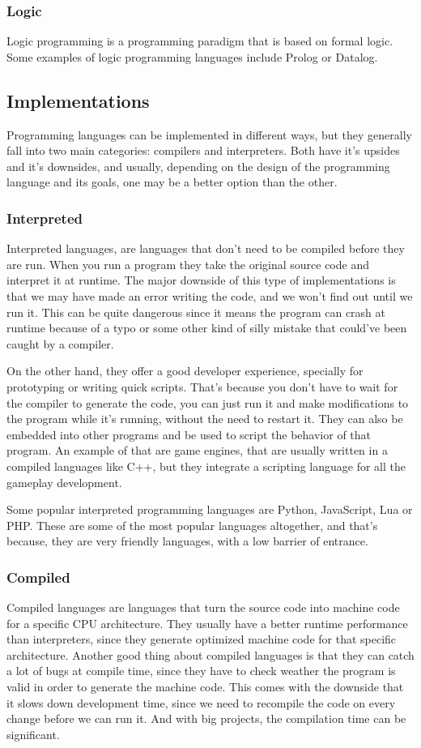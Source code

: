 ﻿\documentclass[10pt,a4paper,twocolumn,twoside]{article}
\begin{document}
\subsubsection{Logic}
Logic programming is a programming paradigm that is based on formal logic. 
Some examples of logic programming languages include Prolog or Datalog.

\subsection{Implementations}
Programming languages can be implemented in different ways, but they generally
fall into two main categories: compilers and interpreters. Both have it's
upsides and it's downsides, and usually, depending on the design of the
programming language and its goals, one may be a better option than the other.

\subsubsection{Interpreted}
Interpreted languages, are languages that don't need to be compiled before they
are run. When you run a program they take the original source code and interpret
it at runtime. The major downside of this type of implementations is that we may
have made an error writing the code, and we won't find out until we run it. This
can be quite dangerous since it means the program can crash at runtime because
of a typo or some other kind of silly mistake that could've been caught by a
compiler.

On the other hand, they offer a good developer experience, specially for
prototyping or writing quick scripts. That's because you don't have to wait for
the compiler to generate the code, you can just run it and make modifications to
the program while it's running, without the need to restart it. They can also be
embedded into other programs and be used to script the behavior of that program.
An example of that are game engines, that are usually written in a compiled
languages like C++, but they integrate a scripting language for all the gameplay
development.

Some popular interpreted programming languages are Python, JavaScript, Lua or
PHP. These are some of the most popular languages altogether, and that's
because, they are very friendly languages, with a low barrier of entrance.

\subsubsection{Compiled}
Compiled languages are languages that turn the source code into machine code for
a specific CPU architecture. They usually have a better runtime performance than
interpreters, since they generate optimized machine code for that specific
architecture. Another good thing about compiled languages is that they can catch
a lot of bugs at compile time, since they have to check weather the program is
valid in order to generate the machine code. This comes with the downside that
it slows down development time, since we need to recompile the code on every
change before we can run it. And with big projects, the compilation time can be
significant.
\end{document}
